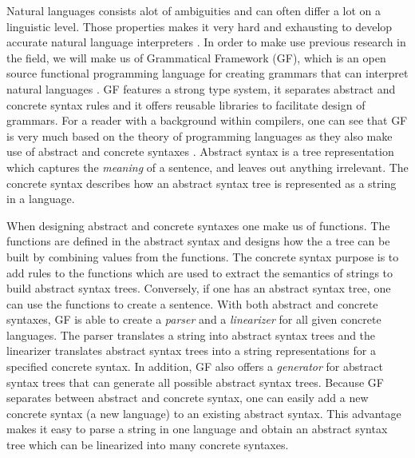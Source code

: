 Natural languages consists alot of ambiguities and can often differ a lot on a linguistic level. Those properties makes it very hard and exhausting to develop accurate natural language interpreters \cite{kaufmann:2007}.
\newline
\newline
In order to make use previous research in the field, we will make us of Grammatical Framework (GF), which is an open source functional programming language for creating grammars that can interpret natural languages \cite[p. 1]{ranta:2011}. GF features a strong type system, it separates abstract and concrete syntax rules and it offers reusable libraries to facilitate design of grammars. For a reader with a background within compilers, one can see that GF is very much based on the theory of programming languages as they also make use of abstract and concrete syntaxes \cite[pp. 69-70]{Aho:1986:CPT:6448}.
\newline
\newline
Abstract syntax is a tree representation which captures the \emph{meaning} of a sentence, and leaves out anything irrelevant. The concrete syntax describes how an abstract syntax tree is represented as a string in a language.

When designing abstract and concrete syntaxes one make us of functions. The functions are defined in the abstract syntax and designs how the a tree can be built by combining values from the functions. The concrete syntax purpose is to add rules to the functions which are used to extract the semantics of strings to build abstract syntax trees. Conversely, if one has an abstract syntax tree, one can use the functions to create a sentence.
\newline
\newline
With both abstract and concrete syntaxes, GF is able to create a \emph{parser} and a \emph{linearizer} for all given concrete languages. The parser translates a string into abstract syntax trees and the linearizer translates abstract syntax trees into a string representations for a specified concrete syntax. In addition, GF also offers a \emph{generator} for abstract syntax trees that can generate all possible abstract syntax trees.
\newline
\newline
Because GF separates between abstract and concrete syntax, one can easily add a new concrete syntax (a new language) to an existing abstract syntax. This advantage makes it easy to parse a string in one language and obtain an abstract syntax tree which can be linearized into many concrete syntaxes.

